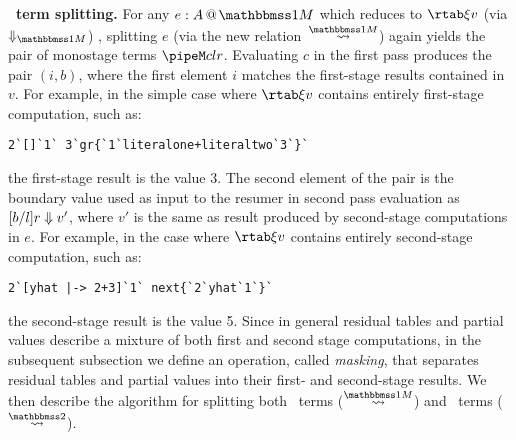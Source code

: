 \begin{abstrsyn}


\textbf{\bbonem\ term splitting.}  For any $\colmix e A$ which reduces
to $\rtab \xi v$ (via $\redonesym$) , splitting $e$ (via the new
relation~$\splitonesym$) again yields the pair of monostage terms
$\pipeM c l r$. Evaluating $c$ in the first pass produces the pair
$(i,b)$, where the first element $i$ matches the first-stage results
contained in $v$.  For example, in the simple case where $\rtab \xi v$
contains entirely first-stage computation, such as:
\begin{lstlisting}
2`[]`1` 3`gr{`1`literalone+literaltwo`3`}`
\end{lstlisting}
the first-stage result is the value 3.  The second element of the pair
is the boundary value used as input to the resumer in second pass
evaluation as ${[b/l]r} \Downarrow {v'}$, where $v'$ is the same as
result produced by second-stage computations in $e$.  For example, in
the case where $\rtab \xi v$ contains entirely second-stage
computation, such as:
\begin{lstlisting}
2`[yhat |-> 2+3]`1` next{`2`yhat`1`}`
\end{lstlisting}
the second-stage result is the value 5. Since in general residual
tables and partial values describe a mixture of both first and second
stage computations, in the subsequent subsection we define an
operation, called {\em masking}, that separates residual tables and
partial values into their first- and second-stage results. We then
describe the algorithm for splitting both \bbonem\ terms
($\splitonesym$) and \bbtwo\ terms ($\splittwosym$).





\end{abstrsyn}
